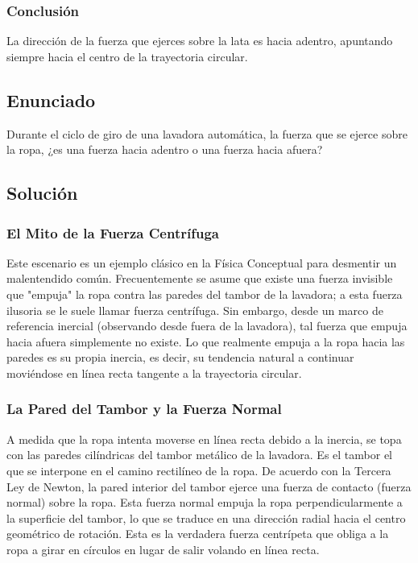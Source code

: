 \documentclass{article}
\begin{document}
\subsubsection*{Conclusión}
La dirección de la fuerza que ejerces sobre la lata es hacia adentro, apuntando siempre hacia el centro de la trayectoria circular.

\newpage

\subsection*{Enunciado}
Durante el ciclo de giro de una lavadora automática, la fuerza que se ejerce sobre la ropa, ¿es una fuerza hacia adentro o una fuerza hacia afuera?

\subsection*{Solución}

\subsubsection*{El Mito de la Fuerza Centrífuga}
Este escenario es un ejemplo clásico en la Física Conceptual para desmentir un malentendido común. Frecuentemente se asume que existe una fuerza invisible que "empuja" la ropa contra las paredes del tambor de la lavadora; a esta fuerza ilusoria se le suele llamar fuerza centrífuga. Sin embargo, desde un marco de referencia inercial (observando desde fuera de la lavadora), tal fuerza que empuja hacia afuera simplemente no existe. Lo que realmente empuja a la ropa hacia las paredes es su propia inercia, es decir, su tendencia natural a continuar moviéndose en línea recta tangente a la trayectoria circular.

\subsubsection*{La Pared del Tambor y la Fuerza Normal}
A medida que la ropa intenta moverse en línea recta debido a la inercia, se topa con las paredes cilíndricas del tambor metálico de la lavadora. Es el tambor el que se interpone en el camino rectilíneo de la ropa. De acuerdo con la Tercera Ley de Newton, la pared interior del tambor ejerce una fuerza de contacto (fuerza normal) sobre la ropa. Esta fuerza normal empuja la ropa perpendicularmente a la superficie del tambor, lo que se traduce en una dirección radial hacia el centro geométrico de rotación. Esta es la verdadera fuerza centrípeta que obliga a la ropa a girar en círculos en lugar de salir volando en línea recta.
\end{document}
